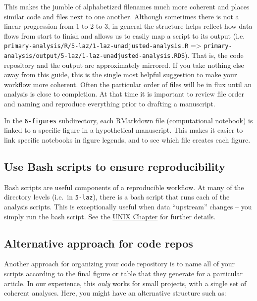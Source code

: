 \documentclass[]{book}
\begin{document}
This makes the jumble of alphabetized filenames much more coherent and places similar code and files next to one another. Although sometimes there is not a linear progression from 1 to 2 to 3, in general the structure helps reflect how data flows from start to finish and allows us to easily map a script to its output (i.e. \texttt{primary-analysis/R/5-laz/1-laz-unadjusted-analysis.R} =\textgreater{} \texttt{primary-analysis/output/5-laz/1-laz-unadjusted-analysis.RDS}). That is, the code repository and the output are approximately mirrored. If you take nothing else away from this guide, this is the single most helpful suggestion to make your workflow more coherent. Often the particular order of files will be in flux until an analysis is close to completion. At that time it is important to review file order and naming and reproduce everything prior to drafting a manuscript.

In the \texttt{6-figures} subdirectory, each RMarkdown file (computational notebook) is linked to a specific figure in a hypothetical manuscript. This makes it easier to link specific notebooks in figure legends, and to see which file creates each figure.

\hypertarget{use-bash-scripts-to-ensure-reproducibility}{%
\subsection{Use Bash scripts to ensure reproducibility}\label{use-bash-scripts-to-ensure-reproducibility}}

Bash scripts are useful components of a reproducible workflow. At many of the directory levels (i.e.~in \texttt{5-laz}), there is a bash script that runs each of the analysis scripts. This is exceptionally useful when data ``upstream'' changes -- you simply run the bash script. See the \protect\hyperlink{unix}{UNIX Chapter} for further details.

\hypertarget{alternative-approach-for-code-repos}{%
\subsection{Alternative approach for code repos}\label{alternative-approach-for-code-repos}}

Another approach for organizing your code repository is to name all of your scripts according to the final figure or table that they generate for a particular article. In our experience, this \emph{only} works for small projects, with a single set of coherent analyses. Here, you might have an alternative structure such as:
\end{document}
